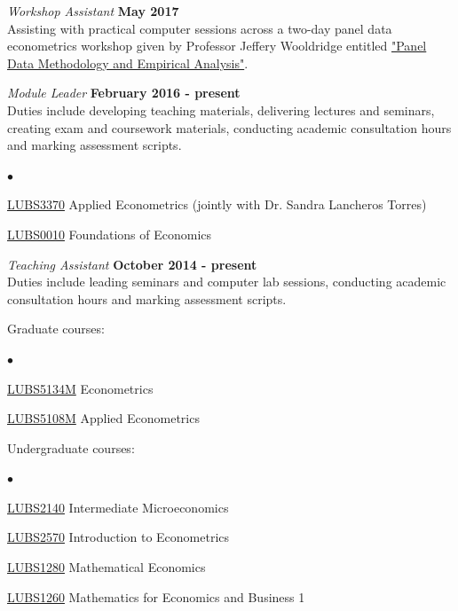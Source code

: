 \documentclass[margin,line,9pt]{res}
\newenvironment{list2}{
  \begin{list}{$\bullet$}{%
      \setlength{\itemsep}{0in}
      \setlength{\parsep}{0in} \setlength{\parskip}{0in}
      \setlength{\topsep}{0in} \setlength{\partopsep}{0in}
      \setlength{\leftmargin}{0.2in}}}{\end{list}}
\begin{document}
\begin{resume}
\vspace{-.3cm}
{\em Workshop Assistant} \hfill {\bf May 2017}\\
Assisting with practical computer sessions across a two-day panel data econometrics workshop given by Professor Jeffery Wooldridge
entitled \href{https://lubswww.leeds.ac.uk/narti/events/article/panel-data-methodology-and-empirical-analysis-with-professor-jeffrey-m-wooldridge-registration-cl/}{"Panel Data Methodology and Empirical Analysis"}.

{\em Module Leader} \hfill {\bf February 2016  - present}\\
Duties include developing teaching materials, delivering lectures and seminars,
creating exam and coursework materials, conducting academic consultation hours and marking assessment scripts.\\

\begin{list2}
\item \href{http://webprod3.leeds.ac.uk/catalogue/dynmodules.asp?Y=201718&F=P&M=LUBS-3370}{LUBS3370} Applied Econometrics (jointly with Dr. Sandra Lancheros Torres)

\item \href{http://webprod3.leeds.ac.uk/catalogue/dynmodules.asp?Y=201718&F=P&M=LUBS-0010}{LUBS0010} Foundations of Economics
\end{list2}

{\em Teaching Assistant} \hfill {\bf October 2014  - present}\\
Duties include leading seminars and computer lab sessions, conducting academic consultation hours and marking assessment scripts.

Graduate courses:\\
\vspace*{-.1in}
\begin{list2}
\item \href{http://webprod3.leeds.ac.uk/catalogue/dynmodules.asp?Y=201415&M=LUBS-5134M}{LUBS5134M} Econometrics
\item \href{http://webprod3.leeds.ac.uk/catalogue/dynmodules.asp?Y=201718&M=LUBS-5108M}{LUBS5108M} Applied Econometrics
\end{list2}

Undergraduate courses:\\
\vspace*{-.1in}
\begin{list2}
\item \href{http://webprod3.leeds.ac.uk/catalogue/dynmodules.asp?Y=201314&M=LUBS-2104}{LUBS2140} Intermediate Microeconomics
\item \href{http://webprod3.leeds.ac.uk/catalogue/dynmodules.asp?Y=201415&M=LUBS-2570}{LUBS2570} Introduction to Econometrics
\item \href{http://webprod3.leeds.ac.uk/catalogue/dynmodules.asp?Y=201415&M=LUBS-1260}{LUBS1280} Mathematical Economics
\item \href{http://webprod3.leeds.ac.uk/catalogue/dynmodules.asp?Y=201415&M=LUBS-1280}{LUBS1260} Mathematics for Economics and Business 1
\end{list2}


\end{resume}
\end{document}
